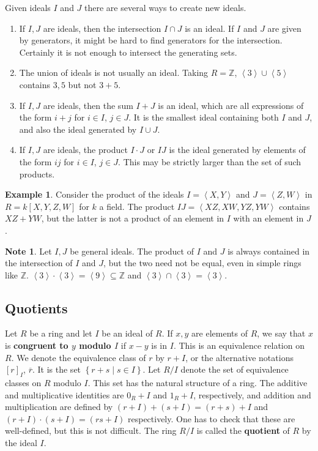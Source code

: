 \documentclass{article}
\newcommand{\Z}{\mathbb{Z}}
\newcommand{\rb}[1]{\left( #1 \right)}
\renewcommand{\sb}[1]{\left[ #1 \right]}
\newcommand{\cb}[1]{\left\{ #1 \right\}}
\newcommand{\ab}[1]{\left\langle #1 \right\rangle}
\theoremstyle{definition}\newtheorem{definition}{Definition}[section]
\theoremstyle{definition}\newtheorem{remark}[definition]{Remark}
\theoremstyle{definition}\newtheorem*{example}{Example}
\theoremstyle{definition}\newtheorem*{note}{Note}
\begin{document}
Given ideals $ I $ and $ J $ there are several ways to create new ideals.
\begin{enumerate}
\item If $ I, J $ are ideals, then the intersection $ I \cap J $ is an ideal. If $ I $ and $ J $ are given by generators, it might be hard to find generators for the intersection. Certainly it is not enough to intersect the generating sets.
\item The union of ideals is not usually an ideal. Taking $ R = \Z $, $ \ab{3} \cup \ab{5} $ contains $ 3, 5 $ but not $ 3 + 5 $.
\item If $ I, J $ are ideals, then the sum $ I + J $ is an ideal, which are all expressions of the form $ i + j $ for $ i \in I $, $ j \in J $. It is the smallest ideal containing both $ I $ and $ J $, and also the ideal generated by $ I \cup J $.
\item If $ I, J $ are ideals, the product $ I \cdot J $ or $ IJ $ is the ideal generated by elements of the form $ ij $ for $ i \in I $, $ j \in J $. This may be strictly larger than the set of such products.
\end{enumerate}

\begin{example}
Consider the product of the ideals $ I = \ab{X, Y} $ and $ J = \ab{Z, W} $ in $ R = k\sb{X, Y, Z, W} $ for $ k $ a field. The product $ IJ = \ab{XZ, XW, YZ, YW} $ contains $ XZ + YW $, but the latter is not a product of an element in $ I $ with an element in $ J $.
\end{example}

\begin{note}
Let $ I, J $ be general ideals. The product of $ I $ and $ J $ is always contained in the intersection of $ I $ and $ J $, but the two need not be equal, even in simple rings like $ \Z $. $ \ab{3} \cdot \ab{3} = \ab{9} \subseteq \Z $ and $ \ab{3} \cap \ab{3} = \ab{3} $.
\end{note}

\subsection{Quotients}

Let $ R $ be a ring and let $ I $ be an ideal of $ R $. If $ x, y $ are elements of $ R $, we say that $ x $ is \textbf{congruent to $ y $ modulo $ I $} if $ x - y $ is in $ I $. This is an equivalence relation on $ R $. We denote the equivalence class of $ r $ by $ r + I $, or the alternative notations $ \sb{r}_I $, $ \overline{r} $. It is the set $ \cb{r + s \mid s \in I} $. Let $ R / I $ denote the set of equivalence classes on $ R $ modulo $ I $. This set has the natural structure of a ring. The additive and multiplicative identities are $ 0_R + I $ and $ 1_R + I $, respectively, and addition and multiplication are defined by $ \rb{r + I} + \rb{s + I} = \rb{r + s} + I $ and $ \rb{r + I} \cdot \rb{s + I} = \rb{rs + I} $ respectively. One has to check that these are well-defined, but this is not difficult. The ring $ R / I $ is called the \textbf{quotient} of $ R $ by the ideal $ I $.
\end{document}
